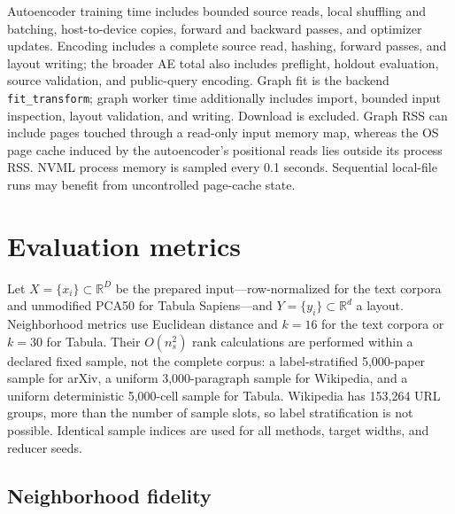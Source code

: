 \documentclass[10pt]{article}
\newcommand{\R}{\mathbb{R}}
\begin{document}
Autoencoder training time includes bounded source reads, local shuffling and batching,
host-to-device copies, forward and backward passes, and optimizer updates.  Encoding
includes a complete source read, hashing, forward passes, and layout writing; the broader
AE total also includes preflight, holdout evaluation, source validation, and public-query
encoding.  Graph fit is the backend \texttt{fit\_transform}; graph worker time additionally
includes import, bounded input inspection, layout validation, and writing.  Download is
excluded.  Graph RSS can include pages touched through a read-only input memory map,
whereas the OS page cache induced by the autoencoder's positional reads lies outside its
process RSS.  NVML process memory is sampled every 0.1 seconds.  Sequential local-file
runs may benefit from uncontrolled page-cache state.

\section{Evaluation metrics}

Let $X=\{x_i\}\subset\R^D$ be the prepared input---row-normalized for the text
corpora and unmodified PCA50 for Tabula Sapiens---and
$Y=\{y_i\}\subset\R^d$ a layout.  Neighborhood metrics use Euclidean distance and
$k=16$ for the text corpora or $k=30$ for Tabula.  Their $O(n_s^2)$ rank calculations
are performed within a declared fixed sample, not the complete corpus: a
label-stratified 5,000-paper sample for arXiv, a uniform 3,000-paragraph sample for
Wikipedia, and a uniform deterministic 5,000-cell sample for Tabula.  Wikipedia has
153,264 URL groups, more than the number of sample slots, so label stratification is not
possible.  Identical sample indices are used for all methods, target widths, and reducer
seeds.

\subsection{Neighborhood fidelity}
\end{document}
